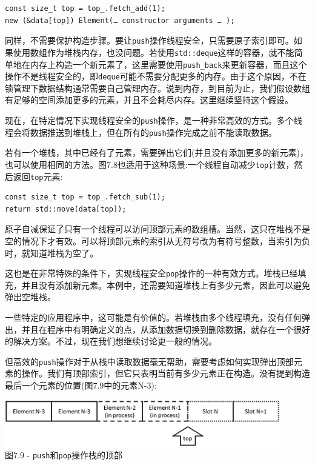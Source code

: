 \begin{lstlisting}[style=styleCXX]
const size_t top = top_.fetch_add(1);
new (&data[top]) Element(… constructor arguments … );
\end{lstlisting}

同样，不需要保护构造步骤。要让\texttt{push}操作线程安全，只需要原子索引即可。如果使用数组作为堆栈内存，也没问题。若使用\texttt{std::deque}这样的容器，就不能简单地在内存上构造一个新元素了，这里需要使用\texttt{push\_back}来更新容器，而且这个操作不是线程安全的，即\texttt{deque}可能不需要分配更多的内存。由于这个原因，不在锁管理下数据结构通常需要自己管理内存。说到内存，到目前为止，我们假设数组有足够的空间添加更多的元素，并且不会耗尽内存。这里继续坚持这个假设。

现在，在特定情况下实现线程安全的\texttt{push}操作，是一种非常高效的方式。多个线程会将数据推送到堆栈上，但在所有的\texttt{push}操作完成之前不能读取数据。

若有一个堆栈，其中已经有了元素，需要弹出它们(并且没有添加更多的新元素)，也可以使用相同的方法。图7.8也适用于这种场景:一个线程自动减少\texttt{top}计数，然后返回\texttt{top}元素:

\begin{lstlisting}[style=styleCXX]
const size_t top = top_.fetch_sub(1);
return std::move(data[top]);
\end{lstlisting}

原子自减保证了只有一个线程可以访问顶部元素的数组槽。当然，这只在堆栈不是空的情况下才有效。可以将顶部元素的索引从无符号改为有符号整数，当索引为负时，就知道堆栈为空了。

这也是在非常特殊的条件下，实现线程安全\texttt{pop}操作的一种有效方式。堆栈已经填充，并且没有添加新元素。本例中，还需要知道堆栈上有多少元素，因此可以避免弹出空堆栈。

一些特定的应用程序中，这可能是有价值的。若堆栈由多个线程填充，没有任何弹出，并且在程序中有明确定义的点，从添加数据切换到删除数据，就存在一个很好的解决方案。不过，现在我们想继续讨论更一般的情况。

但高效的\texttt{push}操作对于从栈中读取数据毫无帮助，需要考虑如何实现弹出顶部元素的操作。我们有顶部索引，但它只表明当前有多少元素正在构造。没有提到构造最后一个元素的位置(图7.9中的元素N-3):

\begin{center}
\includegraphics[width=0.9\textwidth]{content/2/chapter7/images/9.jpg}\\
图7.9 - \texttt{push}和\texttt{pop}操作栈的顶部
\end{center}

